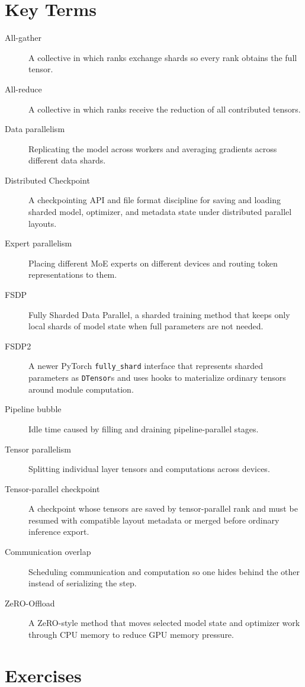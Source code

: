 \section{Key Terms}
\label{sec:distributed-key-terms}

\begin{description}
\item[All-gather] A collective in which ranks exchange shards so every rank obtains the full tensor.
\item[All-reduce] A collective in which ranks receive the reduction of all contributed tensors.
\item[Data parallelism] Replicating the model across workers and averaging gradients across different data shards.
\item[Distributed Checkpoint] A checkpointing API and file format discipline for saving and loading sharded model, optimizer, and metadata state under distributed parallel layouts.
\item[Expert parallelism] Placing different MoE experts on different devices and routing token representations to them.
\item[FSDP] Fully Sharded Data Parallel, a sharded training method that keeps only local shards of model state when full parameters are not needed.
\item[FSDP2] A newer PyTorch \texttt{fully\_shard} interface that represents sharded parameters as \texttt{DTensor}s and uses hooks to materialize ordinary tensors around module computation.
\item[Pipeline bubble] Idle time caused by filling and draining pipeline-parallel stages.
\item[Tensor parallelism] Splitting individual layer tensors and computations across devices.
\item[Tensor-parallel checkpoint] A checkpoint whose tensors are saved by tensor-parallel rank and must be resumed with compatible layout metadata or merged before ordinary inference export.
\item[Communication overlap] Scheduling communication and computation so one hides behind the other instead of serializing the step.
\item[ZeRO-Offload] A ZeRO-style method that moves selected model state and optimizer work through CPU memory to reduce GPU memory pressure.
\end{description}

\section{Exercises}
\label{sec:distributed-exercises}

